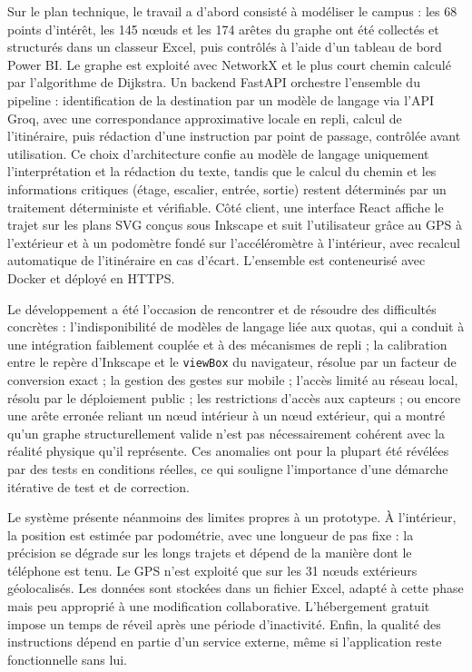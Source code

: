 \documentclass[12pt,a4paper]{report}
\begin{document}
Sur le plan technique, le travail a d'abord consisté à modéliser le campus : les 68 points
d'intérêt, les 145 nœuds et les 174 arêtes du graphe ont été collectés et structurés dans un
classeur Excel, puis contrôlés à l'aide d'un tableau de bord Power BI. Le graphe est exploité avec
NetworkX et le plus court chemin calculé par l'algorithme de Dijkstra. Un backend FastAPI orchestre
l'ensemble du pipeline : identification de la destination par un modèle de langage via l'API Groq,
avec une correspondance approximative locale en repli, calcul de l'itinéraire, puis rédaction d'une
instruction par point de passage, contrôlée avant utilisation. Ce choix d'architecture confie au
modèle de langage uniquement l'interprétation et la rédaction du texte, tandis que le calcul du
chemin et les informations critiques (étage, escalier, entrée, sortie) restent déterminés par un
traitement déterministe et vérifiable. Côté client, une interface React affiche le trajet sur les
plans SVG conçus sous Inkscape et suit l'utilisateur grâce au GPS à l'extérieur et à un podomètre
fondé sur l'accéléromètre à l'intérieur, avec recalcul automatique de l'itinéraire en cas d'écart.
L'ensemble est conteneurisé avec Docker et déployé en HTTPS.

Le développement a été l'occasion de rencontrer et de résoudre des difficultés concrètes :
l'indisponibilité de modèles de langage liée aux quotas, qui a conduit à une intégration faiblement
couplée et à des mécanismes de repli ; la calibration entre le repère d'Inkscape et le
\texttt{viewBox} du navigateur, résolue par un facteur de conversion exact ; la gestion des gestes
sur mobile ; l'accès limité au réseau local, résolu par le déploiement public ; les restrictions
d'accès aux capteurs ; ou encore une arête erronée reliant un nœud intérieur à un nœud extérieur,
qui a montré qu'un graphe structurellement valide n'est pas nécessairement cohérent avec la réalité
physique qu'il représente. Ces anomalies ont pour la plupart été révélées par des tests en
conditions réelles, ce qui souligne l'importance d'une démarche itérative de test et de correction.

Le système présente néanmoins des limites propres à un prototype. À l'intérieur, la position est
estimée par podométrie, avec une longueur de pas fixe : la précision se dégrade sur les longs
trajets et dépend de la manière dont le téléphone est tenu. Le GPS n'est exploité que sur les
31 nœuds extérieurs géolocalisés. Les données sont stockées dans un fichier Excel, adapté à cette
phase mais peu approprié à une modification collaborative. L'hébergement gratuit impose un temps de
réveil après une période d'inactivité. Enfin, la qualité des instructions dépend en partie d'un
service externe, même si l'application reste fonctionnelle sans lui.
\end{document}
